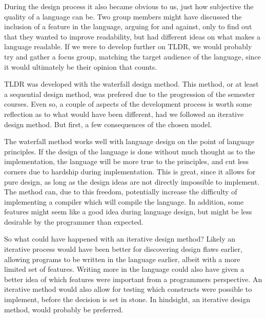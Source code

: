 During the design process it also became obvious to us, just how subjective the quality of a language can be. Two group members might have discussed the inclusion of a feature in the language, arguing for and against, only to find out that they wanted to improve readability, but had different ideas on what makes a language readable. If we were to develop further on TLDR, we would probably try and gather a focus group, matching the target audience of the language, since it would ultimately be their opinion that counts.

TLDR was developed with the waterfall design method. This method, or at least a sequential design method, was prefered due to the progression of the semester courses. Even so, a couple of aspects of the development process is worth some reflection as to what would have been different, had we followed an iterative design method. But first, a few consequences of the chosen model.

The waterfall method works well with language design on the point of language principles. If the design of the language is done without much thought as to the implementation, the language will be more true to the principles, and cut less corners due to hardship during implementation. This is great, since it allows for pure design, as long as the design ideas are not directly impossible to implement. The method can, due to this freedom, potentially increase the difficulty of implementing a compiler which will compile the language. In addition, some features might seem like a good idea during language design, but might be less desirable by the programmer than expected.

So what could have happened with an iterative design method? Likely an iterative process would have been better for discovering design flaws earlier, allowing programs to be written in the language earlier, albeit with a more limited set of features. Writing more in the language could also have given a better idea of which features were important from a programmers perspective. An iterative method would also allow for testing which constructs were possible to implement, before the decision is set in stone. In hindsight, an iterative design method, would probably be preferred.
